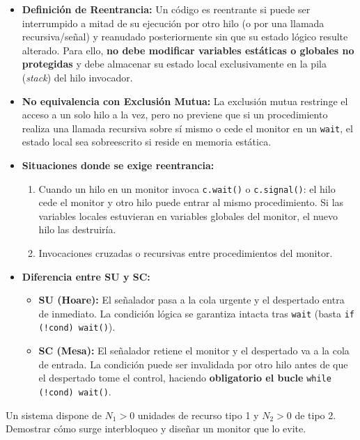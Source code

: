 \begin{solucion}
\begin{itemize}[leftmargin=*]
    \item \textbf{Definición de Reentrancia:} Un código es reentrante si puede ser interrumpido a mitad de su ejecución por otro hilo (o por una llamada recursiva/señal) y reanudado posteriormente sin que su estado lógico resulte alterado. Para ello, \textbf{no debe modificar variables estáticas o globales no protegidas} y debe almacenar su estado local exclusivamente en la pila (\emph{stack}) del hilo invocador.
    \item \textbf{No equivalencia con Exclusión Mutua:} La exclusión mutua restringe el acceso a un solo hilo a la vez, pero no previene que si un procedimiento realiza una llamada recursiva sobre sí mismo o cede el monitor en un \texttt{wait}, el estado local sea sobreescrito si reside en memoria estática.
    \item \textbf{Situaciones donde se exige reentrancia:}
    \begin{enumerate}
        \item Cuando un hilo en un monitor invoca \texttt{c.wait()} o \texttt{c.signal()}: el hilo cede el monitor y otro hilo puede entrar al mismo procedimiento. Si las variables locales estuvieran en variables globales del monitor, el nuevo hilo las destruiría.
        \item Invocaciones cruzadas o recursivas entre procedimientos del monitor.
    \end{enumerate}
    \item \textbf{Diferencia entre SU y SC:}
    \begin{itemize}
        \item \textbf{SU (Hoare):} El señalador pasa a la cola urgente y el despertado entra de inmediato. La condición lógica se garantiza intacta tras \texttt{wait} (basta \texttt{if (!cond) wait()}).
        \item \textbf{SC (Mesa):} El señalador retiene el monitor y el despertado va a la cola de entrada. La condición puede ser invalidada por otro hilo antes de que el despertado tome el control, haciendo \textbf{obligatorio el bucle} \texttt{while (!cond) wait()}.
    \end{itemize}
\end{itemize}
\end{solucion}

\begin{ejercicio}
Un sistema dispone de $N_1 > 0$ unidades de recurso tipo 1 y $N_2 > 0$ de tipo 2. Demostrar cómo surge interbloqueo y diseñar un monitor que lo evite.
\end{ejercicio}

